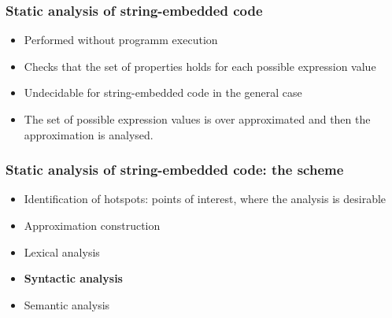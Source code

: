 \documentclass{beamer}
\begin{document}
\begin{frame}
  \transwipe[direction=90]
  \frametitle{Static analysis of string-embedded code}  
  \begin{itemize}
    \item Performed without programm execution
    \item Checks that the set of properties holds for each possible expression value
  \end{itemize}
  
  \begin{itemize}
    \item Undecidable for string-embedded code in the general case
    \item The set of possible expression values is over approximated and then 
the approximation is analysed.
  \end{itemize}
\end{frame}

\begin{frame}
  \transwipe[direction=90]
  \frametitle{Static analysis of string-embedded code: the scheme}
  \begin{itemize}
    \item Identification of hotspots: points of interest, where the analysis is 
desirable
    \item Approximation construction
    \item Lexical analysis
    \item \textbf{Syntactic analysis}
    \item Semantic analysis
  \end{itemize}
\end{frame}
\end{document}
